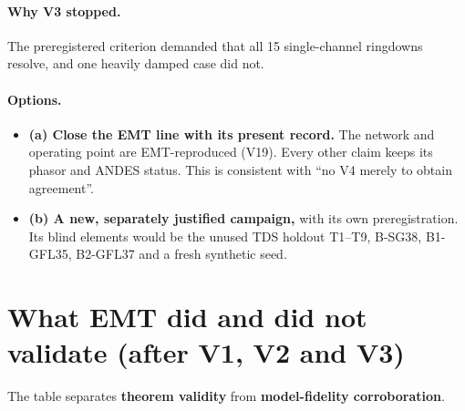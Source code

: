 \documentclass[10pt,a4paper]{article}
\begin{document}
\paragraph{Why V3 stopped.} The preregistered criterion demanded that all 15
single-channel ringdowns resolve, and one heavily damped case did not.

\paragraph{Options.}
\begin{itemize}
\item \textbf{(a) Close the EMT line with its present record.} The network and
  operating point are EMT-reproduced (V19). Every other claim keeps its phasor
  and ANDES status. This is consistent with ``no V4 merely to obtain
  agreement''.
\item \textbf{(b) A new, separately justified campaign,} with its own
  preregistration. Its blind elements would be the unused TDS holdout T1--T9,
  B-SG38, B1-GFL35, B2-GFL37 and a fresh synthetic seed.
\end{itemize}

\section*{What EMT did and did not validate (after V1, V2 and V3)}

The table separates \textbf{theorem validity} from \textbf{model-fidelity
corroboration}.
\end{document}
